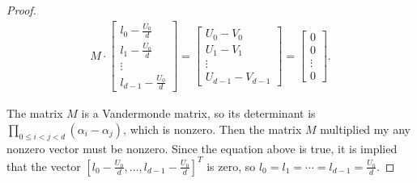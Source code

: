 \documentclass[preprint,12pt]{elsarticle}
\newcommand{\nice}{\textit{convenient} }
\begin{document}
\begin{proof}
    \begin{align}
        M \cdot 
        \begin{bmatrix}
            l_0\!-\!\frac{ U_0}{d} \\ 
            l_1\!-\!\frac{ U_0}{d}\\ 
            \vdots \\ 
            l_{d-1}\!-\!\frac{ U_0}{d}
        \end{bmatrix}
        =
        \begin{bmatrix}
             U_{0}- V_{0} \\ 
             U_{1}- V_{1}\\ 
            \vdots \\ 
             U_{d-1}- V_{d-1}
        \end{bmatrix}
        =
        \begin{bmatrix}
            0     \\ 
            0\\ 
            \vdots \\ 
            0
        \end{bmatrix}.
    \end{align}

    The matrix $M$ is a Vandermonde matrix, so its determinant is $\prod_{0\leqslant i<j<d}(\alpha_i-\alpha_j)$, which is nonzero. Then the matrix $M$ multiplied my any nonzero vector must be nonzero. Since the equation above is true, it is implied that the vector $[l_0\!-\!\frac{ U_0}{d},\ldots,l_{d-1}\!-\!\frac{ U_0}{d}]^T$ is zero, so $l_0=l_1=\cdots=l_{d-1}=\frac{ U_0}{d}$. 

  

\end{proof}




\end{document}
